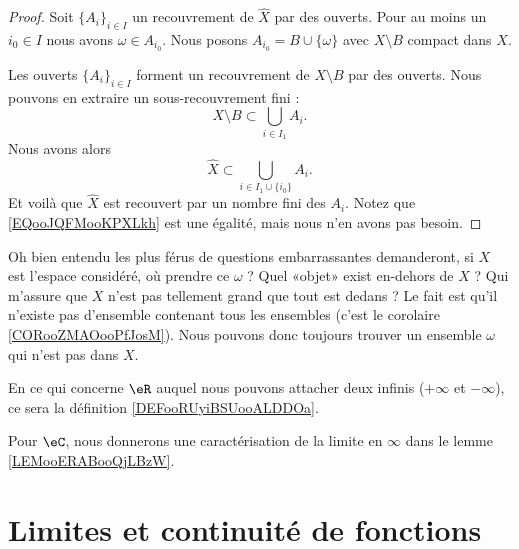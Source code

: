 \begin{proof}
    Soit \( \{ A_i \}_{i\in I}\) un recouvrement de \( \hat X\) par des ouverts. Pour au moins un \( i_0\in I\) nous avons \( \omega\in A_{i_0}\). Nous posons \( A_{i_0}=B\cup\{ \omega \}\) avec \( X\setminus B\) compact dans \( X\).

    Les ouverts \( \{ A_i \}_{i\in I}\) forment un recouvrement de \( X\setminus B\) par des ouverts. Nous pouvons en extraire un sous-recouvrement fini :
    \begin{equation}
        X\setminus B\subset \bigcup_{i\in I_1}A_i.
    \end{equation}
    Nous avons alors
    \begin{equation}        \label{EQooJQFMooKPXLkh}
        \hat X\subset \bigcup_{i\in I_1\cup\{ i_0 \}}A_i.
    \end{equation}
    Et voilà que \( \hat X\) est recouvert par un nombre fini des \( A_i\). Notez que \eqref{EQooJQFMooKPXLkh} est une égalité, mais nous n'en avons pas besoin.
\end{proof}

\begin{normaltext}
    Oh bien entendu les plus férus de questions embarrassantes demanderont, si \( X\) est l'espace considéré, où prendre ce \( \omega\) ? Quel «objet» exist en-dehors de \( X\) ? Qui m'assure que \( X\) n'est pas tellement grand que tout est dedans ? Le fait est qu'il n'existe pas d'ensemble contenant tous les ensembles (c'est le corolaire \ref{CORooZMAOooPfJosM}). Nous pouvons donc toujours trouver un ensemble \( \omega\) qui n'est pas dans \( X\).
\end{normaltext}

En ce qui concerne \( \eR\) auquel nous pouvons attacher deux infinis (\( +\infty\) et \( -\infty\)), ce sera la définition \ref{DEFooRUyiBSUooALDDOa}.

Pour \( \eC\), nous donnerons une caractérisation de la limite en \( \infty\) dans le lemme \ref{LEMooERABooQjLBzW}.

\section{Limites et continuité de fonctions}


